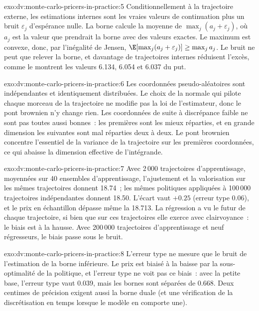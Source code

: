 \begin{solution}{exo:dv:monte-carlo-pricers-in-practice:5}
Conditionnellement à la trajectoire externe, les estimations internes sont les vraies valeurs de continuation plus un bruit $\varepsilon_j$ d'espérance nulle. La borne calcule la
moyenne de $\max_j(a_j+\varepsilon_j)$, où $a_j$ est la valeur que prendrait la borne avec des valeurs exactes. Le maximum est convexe, donc, par l'inégalité de Jensen,
$\E[\max_j(a_j+\varepsilon_j)]\ge\max_j a_j$. Le bruit ne peut que relever la borne, et davantage de trajectoires internes réduisent l'excès, comme le montrent les
valeurs 6.134, 6.054 et 6.037 du put.
\end{solution}

\begin{solution}{exo:dv:monte-carlo-pricers-in-practice:6}
Les coordonnées pseudo-aléatoires sont indépendantes et identiquement distribuées. Le choix de la normale qui pilote chaque morceau de la trajectoire ne modifie pas
la loi de l'estimateur, donc le pont brownien n'y change rien. Les coordonnées de suite à discrépance faible ne sont pas toutes aussi bonnes~: les premières sont les mieux réparties, et en grande
dimension les suivantes sont mal réparties deux à deux. Le pont brownien concentre l'essentiel de la variance de la trajectoire sur les premières coordonnées, ce qui abaisse la
dimension effective de l'intégrande.
\end{solution}

\begin{solution}{exo:dv:monte-carlo-pricers-in-practice:7}
Avec 2\,000 trajectoires d'apprentissage, moyennées sur 40 ensembles d'apprentissage, l'ajustement et la valorisation sur les mêmes trajectoires donnent 18.74~; les mêmes politiques appliquées à 100\,000
trajectoires indépendantes donnent 18.50. L'écart vaut $+0.25$ (erreur type 0.06), et le prix en échantillon dépasse même la  18.713. La
régression a vu le futur de chaque trajectoire, si bien que sur ces trajectoires elle exerce avec clairvoyance~: le biais est à la hausse. Avec 200\,000 trajectoires d'apprentissage et neuf
régresseurs, le biais passe sous le bruit.
\end{solution}

\begin{solution}{exo:dv:monte-carlo-pricers-in-practice:8}
L'erreur type ne mesure que le bruit de l'estimation de la borne inférieure. Le prix est biaisé à la baisse par la sous-optimalité de la politique, et l'erreur type
ne voit pas ce biais~: avec la petite base, l'erreur type vaut 0.039, mais les bornes sont séparées de 0.668. Deux centimes de précision exigent aussi la borne duale (et une
vérification de la discrétisation en temps lorsque le modèle en comporte une).
\end{solution}

